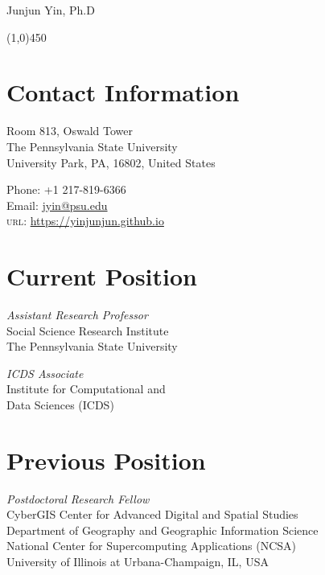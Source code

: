 \documentclass[11pt, a4paper]{article}
\begin{document}
{\LARGE Junjun Yin, Ph.D}
\begin{center}
\line(1,0){450}
\end{center}
\section*{Contact Information}

\begin{multicols}{2}
 \begin{flushleft}
Room 813, Oswald Tower\\
The Pennsylvania State University\\
University Park, PA, 16802, United States
\end{flushleft}
\columnbreak
\begin{flushright}
Phone: +1 217-819-6366\\[.1cm]
Email: \href{mailto:a.jyin@psu.edu}{jyin@psu.edu}\\[.1cm]
\textsc{url}: \href{https://yinjunjun.github.io}{https://yinjunjun.github.io}
\end{flushright}
\end{multicols}


\section*{Current Position}
\begin{multicols}{2}
 \begin{flushleft}
\emph{Assistant Research Professor}\\
Social Science Research Institute\\
The Pennsylvania State University\\
\end{flushleft}
\columnbreak
\begin{flushright}
\emph{ICDS Associate}\\
Institute for Computational and\\
Data Sciences (ICDS)\\
\end{flushright}
\end{multicols}

\section*{Previous Position}
\emph{Postdoctoral Research Fellow}\\
CyberGIS Center for Advanced Digital and Spatial Studies\\
Department of Geography and Geographic Information Science\\
National Center for Supercomputing Applications (NCSA)\\
University of Illinois at Urbana-Champaign, IL, USA
\end{document}
